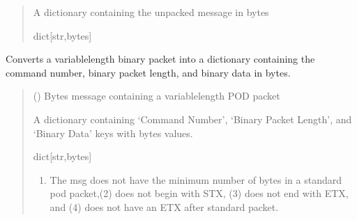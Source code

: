 \documentclass[letterpaper,10pt,english]{sphinxmanual}
\begin{document}
\begin{fulllineitems}
\begin{fulllineitems}
\begin{quote}
\begin{description}
\sphinxAtStartPar
A dictionary containing the unpacked message in bytes

\sphinxAtStartPar
dict{[}str,bytes{]}

\end{description}\end{quote}

\end{fulllineitems}


\begin{fulllineitems}
\label{\detokenize{BasicPodProtocol:BasicPodProtocol.POD_Basics.UnpackPODpacket_Binary}}
\pysigstartsignatures
{}
\pysigstopsignatures
\sphinxAtStartPar
Converts a variable\sphinxhyphen{}length binary packet into a dictionary containing the command
number, binary packet length, and binary data in bytes.
\begin{quote}\begin{description}
\sphinxAtStartPar
{} () \textendash{} Bytes message containing a variable\sphinxhyphen{}length POD packet

\sphinxAtStartPar
A dictionary containing ‘Command Number’, ‘Binary Packet Length’,                 and ‘Binary Data’ keys with bytes values.

\sphinxAtStartPar
dict{[}str,bytes{]}

\sphinxAtStartPar
{} \textendash{} \begin{enumerate}
%
\item {} 
\sphinxAtStartPar
The msg does not have the minimum number of bytes in a standard pod                 packet,(2) does not begin with STX, (3) does not end with ETX, and (4) does                 not have an ETX after standard packet.


\end{enumerate}
\end{description}
\end{quote}
\end{fulllineitems}
\end{fulllineitems}
\end{document}
